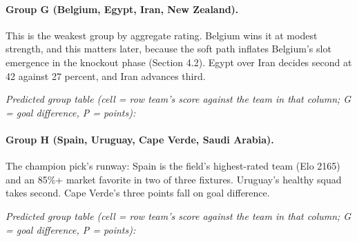 \documentclass[11pt,letterpaper]{article}
\begin{document}
\paragraph{Group G (Belgium, Egypt, Iran, New Zealand).} This is the weakest group by aggregate rating. Belgium wins it at modest strength, and this matters later, because the soft path inflates Belgium's slot emergence in the knockout phase (Section 4.2). Egypt over Iran decides second at 42 against 27 percent, and Iran advances third.

\noindent\textit{\footnotesize Predicted group table (cell = row team's score against the team in that column; G = goal difference, P = points):}



\paragraph{Group H (Spain, Uruguay, Cape Verde, Saudi Arabia).} The champion pick's runway: Spain is the field's highest-rated team (Elo 2165) and an 85\%+ market favorite in two of three fixtures. Uruguay's healthy squad takes second. Cape Verde's three points fall on goal difference.

\noindent\textit{\footnotesize Predicted group table (cell = row team's score against the team in that column; G = goal difference, P = points):}

\end{document}
